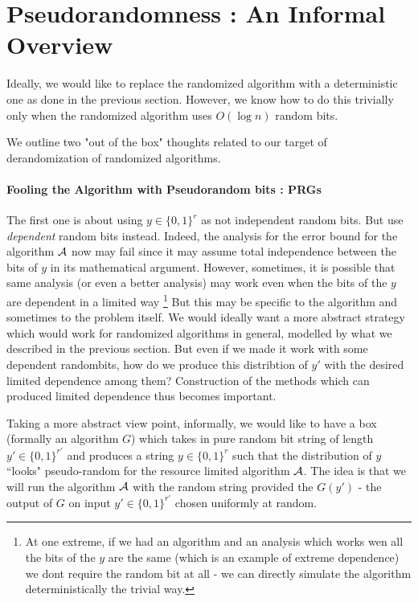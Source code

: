 \section{Pseudorandomness : An Informal Overview}

Ideally, we would like to replace the randomized algorithm with a deterministic one as done in the previous section. However, we know how to do this trivially only when the randomized algorithm uses $O(\log n)$ random bits.

We outline two "out of the box" thoughts related to our target of derandomization of randomized algorithms.

\paragraph{Fooling the Algorithm with Pseudorandom bits : PRGs}

The first one is about using $y \in \{0,1\}^r$ as not independent random bits. But use {\em dependent} random bits instead. Indeed, the analysis for the error bound for the algorithm ${\cal{A}}$ now may fail since it may assume total independence between the bits of $y$ in its mathematical argument. However, sometimes, it is possible that same analysis (or even a better analysis) may work even when the bits of the $y$ are dependent in a limited way \footnote{At one extreme, if we had an algorithm and an analysis which works wen all the bits of the $y$ are the same (which is an example of extreme dependence) we dont require the random bit at all - we can directly simulate the algorithm deterministically the trivial way.} But this may be specific to the algorithm and sometimes to the problem itself. We would ideally want a more abstract strategy which would work for randomized algorithms in general, modelled by what we described in the previous section. But even if we made it work with some dependent randombits, how do we produce this distribtion of $y'$ with the desired limited dependence among them? Construction of the methods which can produced limited dependence thus becomes important.

Taking a more abstract view point, informally, we would like to have a box (formally an algorithm $G$) which takes in pure random bit string of length $y' \in \{0,1\}^{r'}$ and produces a string $y \in \{0,1\}^r$ such that the distribution of $y$ ``looks" pseudo-random for the resource limited algorithm ${\cal{A}}$. The idea is that we will run the algorithm ${\cal{A}}$ with the random string provided the $G(y')$ - the output of $G$ on input $y' \in \{0,1\}^{r'}$ chosen uniformly at random. 

